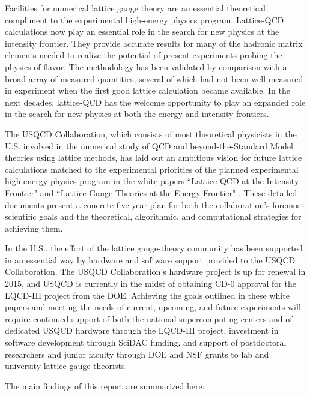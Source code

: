 Facilities for numerical lattice gauge theory are an essential theoretical compliment to the experimental
high-energy physics program.  Lattice-QCD calculations now play an essential role in the search for new physics at the intensity frontier.
They provide accurate results for many of the hadronic matrix elements needed to realize the potential of
present experiments probing the physics of flavor. The methodology has been validated by comparison 
with a broad array of measured quantities, several of which had not been well measured in experiment when the first good lattice calculation became available.  In the next decades, lattice-QCD has the welcome opportunity to play an expanded role in the search for new physics at both the energy and intensity frontiers.  

The USQCD Collaboration, which consists of most theoretical physicists in the U.S. involved in the numerical study of QCD and beyond-the-Standard Model theories using lattice methods, has laid out an ambitious vision for future lattice calculations matched to the experimental priorities of the planned experimental high-energy physics program in the white papers ``Lattice QCD at the Intensity Frontier" and ``Lattice Gauge Theories at the Energy Frontier" \cite{USQCD_IF_whitepaper13,USQCD_EF_whitepaper13}.  These detailed documents present a concrete five-year plan for both the collaboration's foremost scientific goals and the theoretical, algorithmic, and computational strategies for achieving them.

In the U.S., the effort of the lattice gauge-theory community has been supported in an essential way by hardware and software support provided to the USQCD Collaboration.  The USQCD Collaboration's hardware project is up for renewal in 2015, and USQCD is currently in the midst of obtaining CD-0 approval for the LQCD-III project from the DOE.  Achieving the goals outlined in these white papers and meeting the needs of current, upcoming, and future experiments will require continued support of both the national supercomputing centers and of dedicated USQCD hardware through the LQCD-III project, investment in software development through SciDAC funding, and support of postdoctoral researchers and junior faculty through DOE and NSF grants to lab and university lattice gauge theorists.   

The main findings of this report are summarized here:

